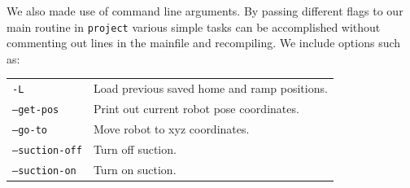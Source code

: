 \documentclass{article}
\begin{document}
We also made use of command line arguments. By passing different flags to our main routine in \texttt{project} various simple tasks can be accomplished without commenting out lines in the mainfile and recompiling. We include options such as:

\begin{tabular}{ll}
	\texttt{-L} & Load previous saved home and ramp positions.\\
	\texttt{--get-pos} & Print out current robot pose coordinates. \\
	\texttt{--go-to} & Move robot to xyz coordinates. \\
	\texttt{--suction-off} & Turn off suction. \\
	\texttt{--suction-on} & Turn on suction. \\
\end{tabular}
\end{document}
